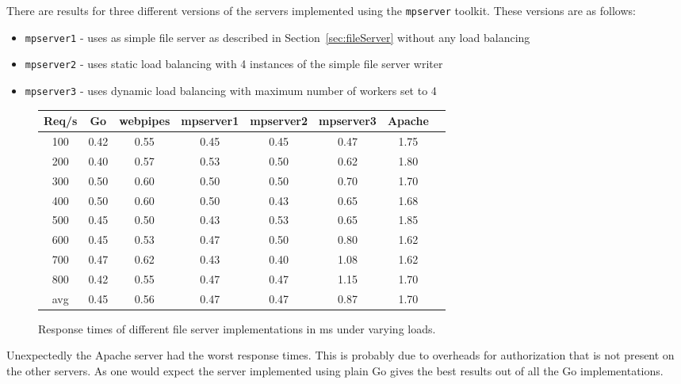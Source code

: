 \newpage
There are results for three different versions of the servers implemented using 
the \texttt{mpserver} toolkit. These versions are as follows:
\begin{itemize}
	\item \texttt{mpserver1} - uses as simple file server as 
		  described in Section~\ref{sec:fileServer} without any load balancing

	\item \texttt{mpserver2} - uses static load balancing with 4 instances
		  of the simple file server writer

	\item \texttt{mpserver3} - uses dynamic load balancing with maximum number of 
		  workers set to 4
\end{itemize}

\begin{figure}[h]
\begin{center}
\begin{tabular}{|c|c|c|c|c|c|c|c|}
\hline
Req/s & Go & webpipes & mpserver1 & mpserver2 & mpserver3 & Apache\\
\hline
100 & 0.42 & 0.55 & 0.45 & 0.45 & 0.47 & 1.75 \\
200 & 0.40 & 0.57 & 0.53 & 0.50 & 0.62 & 1.80 \\
300 & 0.50 & 0.60 & 0.50 & 0.50 & 0.70 & 1.70 \\
400 & 0.50 & 0.60 & 0.50 & 0.43 & 0.65 & 1.68 \\
500 & 0.45 & 0.50 & 0.43 & 0.53 & 0.65 & 1.85 \\
600 & 0.45 & 0.53 & 0.47 & 0.50 & 0.80 & 1.62 \\
700 & 0.47 & 0.62 & 0.43 & 0.40 & 1.08 & 1.62 \\
800 & 0.42 & 0.55 & 0.47 & 0.47 & 1.15 & 1.70 \\
\hline
avg & 0.45 & 0.56 &	0.47 & 0.47 & 0.87 & 1.70 \\
\hline
\end{tabular}
\end{center}
\caption{Response times of different file server implementations in ms under varying loads.}
\label{results}
\end{figure}

Unexpectedly the Apache server had the worst response times. This is probably due to 
overheads for authorization that is not present on the other servers. As one would expect
the server implemented using plain Go gives the best results out of all the Go
implementations. 

